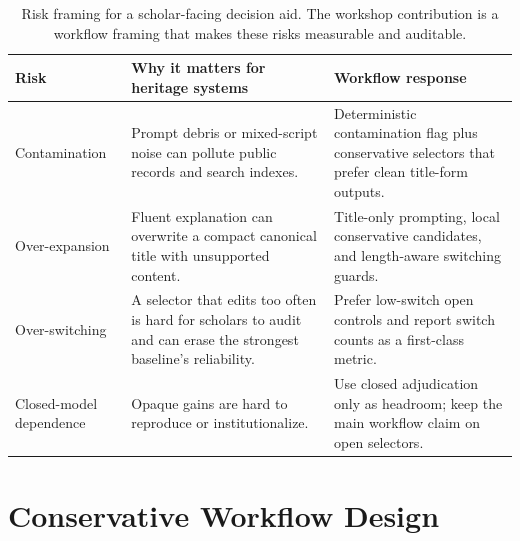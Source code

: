 \documentclass{article}
\begin{document}
\begin{table}[t]
\centering
\small
\begin{tabularx}{\columnwidth}{@{}>{\raggedright\arraybackslash}p{}>{\raggedright\arraybackslash}p{}>{\raggedright\arraybackslash}X@{}}
\toprule
Risk & Why it matters for heritage systems & Workflow response \\
\midrule
Contamination & Prompt debris or mixed-script noise can pollute public records and search indexes. & Deterministic contamination flag plus conservative selectors that prefer clean title-form outputs. \\
Over-expansion & Fluent explanation can overwrite a compact canonical title with unsupported content. & Title-only prompting, local conservative candidates, and length-aware switching guards. \\
Over-switching & A selector that edits too often is hard for scholars to audit and can erase the strongest baseline's reliability. & Prefer low-switch open controls and report switch counts as a first-class metric. \\
Closed-model dependence & Opaque gains are hard to reproduce or institutionalize. & Use closed adjudication only as headroom; keep the main workflow claim on open selectors. \\
\bottomrule
\end{tabularx}
\caption{Risk framing for a scholar-facing decision aid. The workshop contribution is a workflow framing that makes these risks measurable and auditable.}
\label{tab:riskmap}
\end{table}

\section{Conservative Workflow Design}
\end{document}
